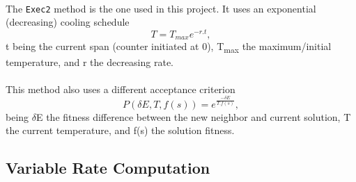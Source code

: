 \\
The \verb+Exec2+ method is the one used in this project. It uses an exponential (decreasing) cooling schedule \cite{CarvalhoLisbonNovember2004}\\
\begin{equation} 
T = T_{max}e^{-r.t},
\end{equation}
t being the current span (counter initiated at 0), T\textsubscript{max} the maximum/initial temperature, and r the decreasing rate.\\
\\
This method also uses a different acceptance criterion \begin{equation} P(\delta E, T, f(s)) = e^{\frac{-\delta E}{T.f(s)}},
\end{equation}
being $\delta$E the fitness difference between the new neighbor and current solution, T the current temperature, and f(s) the solution fitness.
\\
\subsection{Variable Rate Computation}

